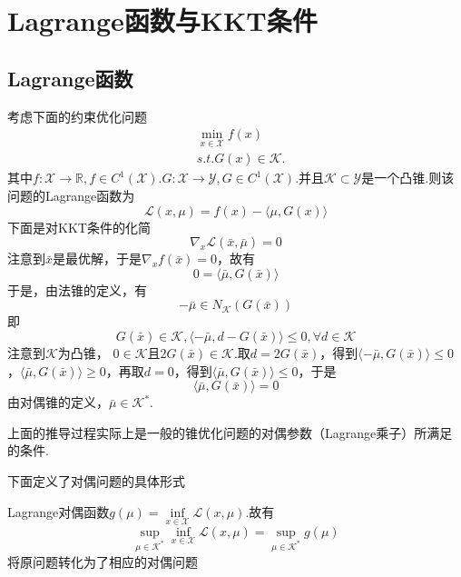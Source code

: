\section{Lagrange函数与KKT条件}
\subsection{Lagrange函数}
考虑下面的约束优化问题
\begin{equation*}\label{}
	\begin{split}
		&\min\limits_{x\in\mathcal{X}} f(x)\\
		&s.t. G(x)\in \mathcal{K}.
	\end{split}
\end{equation*}
其中$f:\mathcal{X}\rightarrow \mathbb{R}, f\in C^1(\mathcal{X})$.$G:\mathcal{X}\rightarrow \mathcal{Y}, G\in C^1(\mathcal{X})$.并且$\mathcal{K}\subset \mathcal{Y}$是一个凸锥.则该问题的Lagrange函数为
\begin{equation*}
	\mathcal{L}(x,\mu) = f(x) - \langle \mu, G(x)\rangle
\end{equation*}
下面是对KKT条件的化简
\begin{equation*}
	\nabla_x\mathcal{L}(\bar{x}, \bar{\mu}) = 0
\end{equation*}
注意到$\bar{x}$是最优解，于是$\nabla_x f(\bar{x}) = 0$，故有
\begin{equation*}
	0 = \langle \bar\mu, G(\bar{x})\rangle
\end{equation*}
于是，由法锥的定义，有
\begin{equation*}
	-\bar{\mu} \in N_{\mathcal{K}}(G(\bar{x}))
\end{equation*}
即
\begin{equation*}
	G(\bar{x}) \in \mathcal{K}, \langle -\bar{\mu}, d-G(\bar{x})\rangle \leq 0, \forall d\in \mathcal{K}
\end{equation*}
注意到$\mathcal{K}$为凸锥， $0\in \mathcal K$且$2G(\bar{x})\in\mathcal K$.取$d = 2G(\bar{x})$，得到$\langle -\bar{\mu},  G(\bar{x})\rangle\leq 0$，$\langle \bar{\mu}, G(\bar{x})\rangle \geq 0$，再取$d = 0$，得到$\langle \bar{\mu}, G(\bar{x})\rangle \leq 0$，于是
\begin{equation*}
	\langle \bar{\mu}, G(\bar{x})\rangle = 0
\end{equation*}
由对偶锥的定义，$\bar{\mu}\in\mathcal{K}^*$.
\begin{note}
	上面的推导过程实际上是一般的锥优化问题的对偶参数（Lagrange乘子）所满足的条件.
\end{note}
下面定义了对偶问题的具体形式
\begin{definition}
	Lagrange对偶函数$g(\mu) = \inf\limits_{x\in\mathcal{X}}\mathcal{L}(x, \mu)$.故有
	\begin{equation*}
		\sup\limits_{\mu \in \mathcal{K}^*}\inf\limits_{x\in\mathcal{X}}\mathcal{L}(x, \mu) = \sup\limits_{\mu \in \mathcal{K}^*} g(\mu)
	\end{equation*}
	将原问题转化为了相应的对偶问题
\end{definition}
